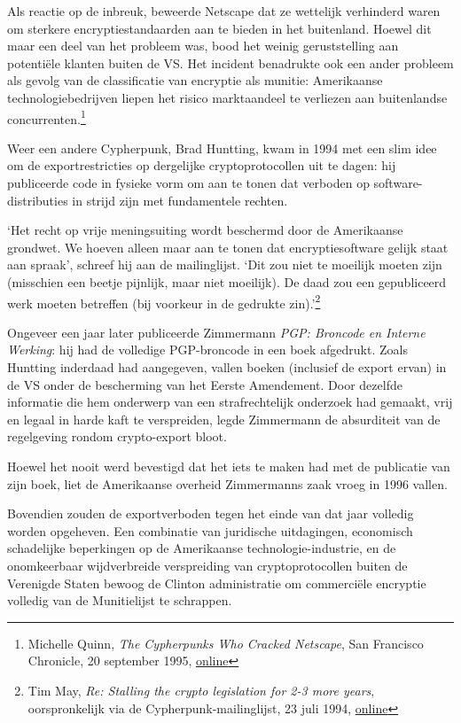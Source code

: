 \documentclass[
  a5paper,
  smalldemyvopaper,11pt,twoside,onecolumn,openright,extrafontsizes,
hidelinks]{memoir}
\begin{document}
Als reactie op de inbreuk, beweerde Netscape dat ze wettelijk verhinderd
waren om sterkere encryptiestandaarden aan te bieden in het buitenland.
Hoewel dit maar een deel van het probleem was, bood het weinig
geruststelling aan potentiële klanten buiten de VS. Het incident
benadrukte ook een ander probleem als gevolg van de classificatie van
encryptie als munitie: Amerikaanse technologiebedrijven liepen het
risico marktaandeel te verliezen aan buitenlandse
concurrenten.\footnote{Michelle Quinn, \emph{The Cypherpunks Who Cracked
  Netscape}, San Francisco Chronicle, 20 september 1995,
  \href{https://people.eecs.berkeley.edu//~daw/press/iang/ian1.html}{online}}

Weer een andere Cypherpunk, Brad Huntting, kwam in 1994 met een slim
idee om de exportrestricties op dergelijke cryptoprotocollen uit te
dagen: hij publiceerde code in fysieke vorm om aan te tonen dat verboden
op software-distributies in strijd zijn met fundamentele rechten.

`Het recht op vrije meningsuiting wordt beschermd door de Amerikaanse
grondwet. We hoeven alleen maar aan te tonen dat encryptiesoftware
gelijk staat aan spraak', schreef hij aan de mailinglijst. `Dit zou niet
te moeilijk moeten zijn (misschien een beetje pijnlijk, maar niet
moeilijk). De daad zou een gepubliceerd werk moeten betreffen (bij
voorkeur in de gedrukte zin).'\footnote{Tim May, \emph{Re: Stalling the
  crypto legislation for 2-3 more years}, oorspronkelijk via de
  Cypherpunk-mailinglijst, 23 juli 1994,
  \href{https://cypherpunks.venona.com/date/1994/07/msg01245.html}{online}}

Ongeveer een jaar later publiceerde Zimmermann \emph{PGP: Broncode en
Interne Werking}: hij had de volledige PGP-broncode in een boek
afgedrukt. Zoals Huntting inderdaad had aangegeven, vallen boeken
(inclusief de export ervan) in de VS onder de bescherming van het Eerste
Amendement. Door dezelfde informatie die hem onderwerp van een
strafrechtelijk onderzoek had gemaakt, vrij en legaal in harde kaft te
verspreiden, legde Zimmermann de absurditeit van de regelgeving rondom
crypto-export bloot.

Hoewel het nooit werd bevestigd dat het iets te maken had met de
publicatie van zijn boek, liet de Amerikaanse overheid Zimmermanns zaak
vroeg in 1996 vallen.

Bovendien zouden de exportverboden tegen het einde van dat jaar volledig
worden opgeheven. Een combinatie van juridische uitdagingen, economisch
schadelijke beperkingen op de Amerikaanse technologie-industrie, en de
onomkeerbaar wijdverbreide verspreiding van cryptoprotocollen buiten de
Verenigde Staten bewoog de Clinton administratie om commerciële
encryptie volledig van de Munitielijst te schrappen.
\end{document}
